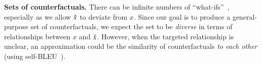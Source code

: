 \textbf{Sets of counterfactuals.} There can be infinite numbers of ``what-ifs''~\cite{pearl2018causal, kahneman}, especially as we allow $\hat{x}$ to deviate from $x$. Since our goal is to produce a general-purpose set of counterfactuals, we expect the set to be \emph{diverse} in terms of relationships between $x$ and $\hat{x}$.
However, when the targeted relationship is unclear, an approximation could be the similarity of counterfactuals \emph{to each other} (using \eg self-BLEU~\cite{Hu2017TowardCG}).






